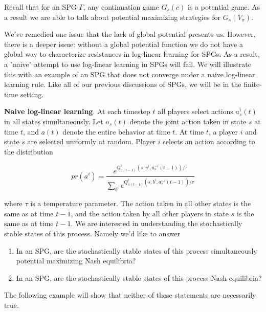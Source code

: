 Recall that for an SPG $\Gamma$, any continuation game $G_s(c)$ is a potential game. As a result we are able to talk about potential maximizing strategies for $G_s(V_{\pi})$. 


We've remedied one issue that the lack of global potential presents us. However, there is a deeper issue: without a global potential function we do not have a global way to characterize resistances in log-linear learning for SPGs. As a result, a "naive" attempt to use log-linear learning in SPGs will fail. We will illustrate this with an example of an SPG that does not converge under a naive log-linear learning rule. Like all of our previous discussions of SPGs, we will be in the finite-time setting.

{\bf Naive log-linear learning}. At each timestep $t$ all players select actions $a^i_s(t)$ in all states simultaneously. Let $a_s(t)$ denote the joint action taken in state $s$ at time $t$, and $a(t)$ denote the entire behavior at time $t$. At time $t$, a player $i$ and state $s$ are selected uniformly at random. Player $i$ selects an action according to the distribution

$$
pr(a^i) = \dfrac{e^{Q^i_{a(t-1)}(s, a^i, a^{-i}_s(t-1))/\tau}}{\sum_{b^i}e^{Q^i_{a(t-1)}(s, b^i, a^{-i}_s(t-1))/\tau}}
$$

where $\tau$ is a temperature parameter. The action taken in all other states is the same as at time $t-1$, and the action taken by all other players in state $s$ is the same as at time $t-1$. We are interested in understanding the stochastically stable states of this process. Namely we'd like to answer

\begin{enumerate}
\item In an SPG, are the stochastically stable states of this process simultaneously potential maximizing Nash equilibria?
\item In an SPG, are the stochastically stable states of this process Nash equilibria?
\end{enumerate}

The following example will show that neither of these statements are necessarily true.



